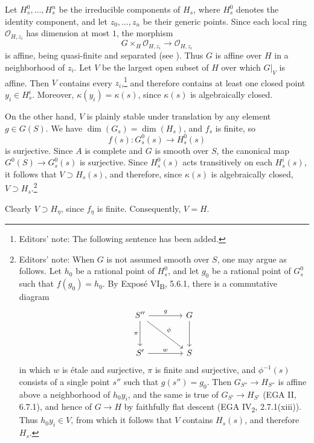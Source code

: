 Let \(H_s^0,\ldots,H_s^n\) be the irreducible components of \(H_s\),
where \(H_s^0\) denotes the identity component, and let
\(z_0,\ldots,z_n\) be their generic points. Since each local ring
\(\mathcal O_{H,z_i}\) has dimension at most \(1\), the morphism
\[
 G\times_H\mathcal O_{H,z_i}\longrightarrow\mathcal O_{H,z_i}
\]
is affine, being quasi-finite and separated (see ).
Thus \(G\) is affine over \(H\) in a neighborhood of \(z_i\). Let \(V\)
be the largest open subset of \(H\) over which \(G|_V\) is affine.
Then \(V\) contains every \(z_i\),\footnote{Editors' note: The following
sentence has been added.} and therefore contains at least one closed
point \(y_i\in H_s^i\). Moreover,
\(\kappa(y_i)=\kappa(s)\), since \(\kappa(s)\) is algebraically closed.

On the other hand, \(V\) is plainly stable under translation by any
element \(g\in G(S)\). We have \(\dim(G_s)=\dim(H_s)\), and \(f_s\) is
finite, so
\[
 f(s)\colon G_s^0(s)\longrightarrow H_s^0(s)
\]
is surjective. Since \(A\) is complete and \(G\) is smooth over \(S\),
the canonical map \(G^0(S)\to G_s^0(s)\) is surjective. Since
\(H_s^0(s)\) acts transitively on each \(H_s^i(s)\), it follows that
\(V\supset H_s(s)\), and therefore, since \(\kappa(s)\) is algebraically
closed, \(V\supset H_s\).\footnote{Editors' note: When \(G\) is not
assumed smooth over \(S\), one may argue as follows. Let \(h_0\) be a
rational point of \(H_s^0\), and let \(g_0\) be a rational point of
\(G_s^0\) such that \(f(g_0)=h_0\). By Exposé VI\textsubscript{B},
5.6.1, there is a commutative diagram
\[
\begin{tikzcd}[ampersand replacement=\&,column sep=4.0em,row sep=3.0em]
S'' \arrow[r,"g"] \arrow[d,"\pi"'] \arrow[dr,"\phi"]
  \& G \arrow[d]\\
S' \arrow[r,"w"] \& S
\end{tikzcd}
\]
in which \(w\) is étale and surjective, \(\pi\) is finite and
surjective, and \(\phi^{-1}(s)\) consists of a single point \(s''\)
such that \(g(s'')=g_0\). Then \(G_{S''}\to H_{S''}\) is affine above
a neighborhood of \(h_0y_i\), and the same is true of
\(G_{S'}\to H_{S'}\) (EGA II, 6.7.1), and hence of \(G\to H\) by
faithfully flat descent (EGA IV\textsubscript{2}, 2.7.1(xiii)).
Thus \(h_0y_i\in V\), from which it follows that \(V\) contains
\(H_s(s)\), and therefore \(H_s\).}

Clearly \(V\supset H_\eta\), since \(f_\eta\) is finite. Consequently,
\(V=H\). \SGAQED

